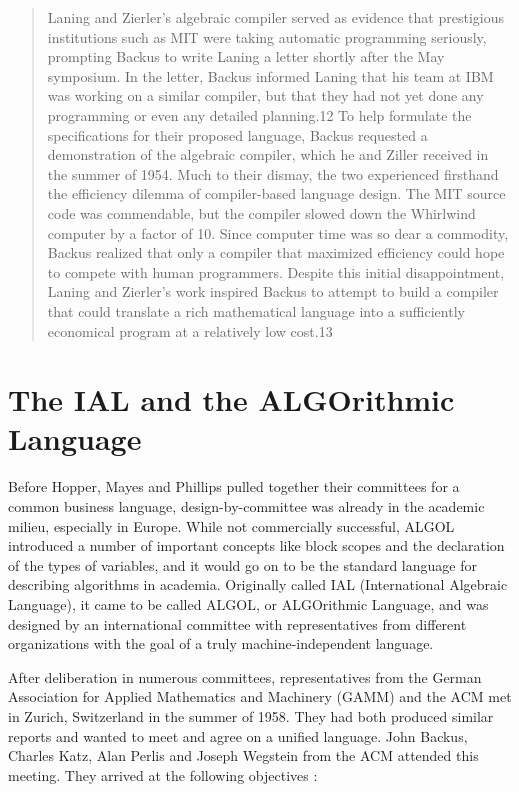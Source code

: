 \begin{quotation}
Laning and Zierler's algebraic compiler served as evidence that prestigious
institutions such as MIT were taking automatic programming
seriously, prompting
Backus to write Laning a letter shortly after the May symposium.
In the letter,
Backus informed Laning that his team at IBM was working on a
similar compiler,
but that they had not yet done any programming or even any
detailed planning.12
To help formulate the specifications for their proposed language, Backus
requested a demonstration of the algebraic compiler, which he and Ziller
received in the summer of 1954. Much to their dismay, the two
experienced firsthand the efficiency dilemma of compiler-based
language design. The MIT
source code was commendable, but the compiler slowed down the Whirlwind
computer by a factor of 10. Since computer time was so dear a
commodity, Backus
realized that only a compiler that maximized efficiency could
hope to compete
with human programmers. Despite this initial disappointment, Laning and
Zierler's work inspired Backus to attempt to build a compiler that could
translate a rich mathematical language into a sufficiently
economical program
at a relatively low cost.13
\cite{grace_hopper_and_the_invention_of_the_information_age_2009}
\end{quotation}

\section{The IAL and the ALGOrithmic Language}

Before Hopper, Mayes and Phillips pulled together their committees for a common
business language, design-by-committee was already in the academic milieu,
especially in Europe.
While not commercially successful, ALGOL introduced a number of important concepts
like block scopes and the declaration of the types of variables, and it would
go on to be the standard language for describing algorithms in academia.
Originally called IAL (International Algebraic Language), it came to be called
ALGOL, or ALGOrithmic Language, and was designed by an international committee
with representatives from different organizations with the goal of a truly
machine-independent language.

After deliberation in numerous committees, representatives from the German
Association for Applied Mathematics and Machinery (GAMM) and the ACM met in
Zurich, Switzerland in the summer of 1958. They had both produced similar
reports and wanted to meet and agree on a unified language.
John Backus, Charles Katz, Alan Perlis and Joseph Wegstein from the ACM attended this meeting.
They arrived at the following objectives
\cite{perlis_samelson_1958_preliminary_report_ial}:

